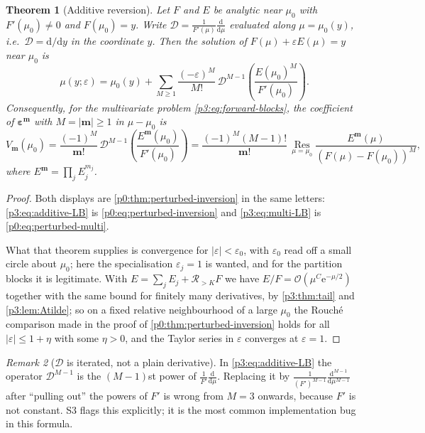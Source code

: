 \documentclass[11pt,a4paper,oneside]{book}
\theoremstyle{plain}
\newtheorem{theorem}{Theorem}[chapter]
\theoremstyle{definition}
\theoremstyle{remark}
\newtheorem{remark}[theorem]{Remark}
\newcommand{\e}{\mathrm{e}}
\newcommand{\dd}{\mathrm{d}}
\newcommand{\bigO}{\mathcal{O}}
\begin{document}
\begin{theorem}[Additive reversion]\label{p3:thm:additive-LB}
Let $F$ and $E$ be analytic near $\mu_{0}$ with $F'(\mu_{0})\ne0$ and $F(\mu_{0})=y$. Write
$\mathcal{D}=\frac1{F'(\mu)}\frac{\dd}{\dd\mu}$ evaluated along $\mu=\mu_{0}(y)$, i.e.\
$\mathcal{D}=\dd/\dd y$ in the coordinate $y$. Then the solution of $F(\mu)+\varepsilon E(\mu)=y$
near $\mu_{0}$ is
\begin{equation}\label{p3:eq:additive-LB}
 \mu(y;\varepsilon)=\mu_{0}(y)
 +\sum_{M\ge1}\frac{(-\varepsilon)^{M}}{M!}\,
 \mathcal{D}^{M-1}\!\left(\frac{E(\mu_{0})^{M}}{F'(\mu_{0})}\right).
\end{equation}
Consequently, for the multivariate problem \cref{p3:eq:forward-blocks}, the coefficient of
$\boldsymbol\varepsilon^{\boldsymbol m}$ with $M=|\boldsymbol m|\ge1$ in $\mu-\mu_{0}$ is
\begin{equation}\label{p3:eq:multi-LB}
 V_{\boldsymbol m}(\mu_{0})=\frac{(-1)^{M}}{\boldsymbol m!}\,
 \mathcal{D}^{M-1}\!\left(\frac{E^{\boldsymbol m}(\mu_{0})}{F'(\mu_{0})}\right)
 =\frac{(-1)^{M}(M-1)!}{\boldsymbol m!}\,
 \operatorname*{Res}_{\mu=\mu_{0}}\frac{E^{\boldsymbol m}(\mu)}{(F(\mu)-F(\mu_{0}))^{M}},
\end{equation}
where $E^{\boldsymbol m}=\prod_{j}E_{j}^{m_{j}}$.
\end{theorem}

\begin{proof}
Both displays are \cref{p0:thm:perturbed-inversion} in the same letters:
\cref{p3:eq:additive-LB} is \eqref{p0:eq:perturbed-inversion} and
\cref{p3:eq:multi-LB} is \eqref{p0:eq:perturbed-multi}.

What that theorem supplies is convergence for $|\varepsilon|<\varepsilon_{0}$,
with $\varepsilon_{0}$ read off a small circle about $\mu_{0}$; here the
specialisation $\varepsilon_{j}=1$ is wanted, and for the partition blocks it
is legitimate.  With $E=\sum_{j}E_{j}+\mathcal{R}_{>K}F$ we have
$E/F=\bigO(\mu^{C}\e^{-\mu/2})$ together with the same bound for finitely many
derivatives, by \cref{p3:thm:tail} and \cref{p3:lem:Atilde}; so on a fixed
relative neighbourhood of a large $\mu_{0}$ the Rouch\'e comparison made in
the proof of \cref{p0:thm:perturbed-inversion} holds for all
$|\varepsilon|\le1+\eta$ with some $\eta>0$, and the Taylor series in
$\varepsilon$ converges at $\varepsilon=1$.
\end{proof}

\begin{remark}[$\mathcal{D}$ is iterated, not a plain derivative]
\label{p3:rem:D-iterated}
In \cref{p3:eq:additive-LB} the operator $\mathcal{D}^{M-1}$ is the $(M-1)$st power of
$\frac1{F'}\frac{\dd}{\dd\mu}$. Replacing it by $\frac1{(F')^{M-1}}\frac{\dd^{M-1}}{\dd\mu^{M-1}}$
after ``pulling out'' the powers of $F'$ is wrong from $M=3$ onwards, because $F'$ is not
constant. S3 flags this explicitly; it is the most common implementation bug in this formula.
\end{remark}
\end{document}
